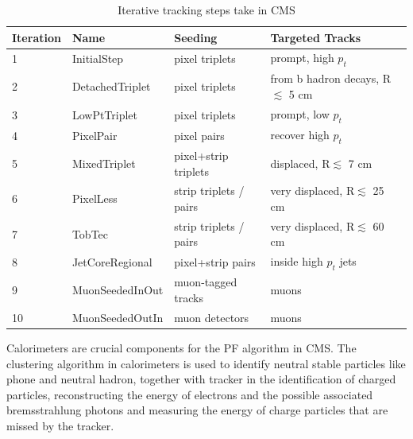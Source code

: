 \begin{table}[!tpb]
\caption{Iterative tracking steps take in CMS \label{tbl:iterative_tracking}}
\label{tab:antil}
\begin{center}
\begin{tabular}{|llll|}   
\hline
Iteration                   &  Name               &   Seeding            &  Targeted Tracks  \\\hline
1                              & InitialStep          & pixel triplets        &  prompt, high $p_{t}$   \\
2                              & DetachedTriplet          & pixel triplets        &  from b hadron decays, R$\lesssim$ 5 cm  \\
3                              & LowPtTriplet          & pixel triplets        &  prompt, low $p_{t}$ \\
4                              & PixelPair          & pixel pairs                &  recover high $p_{t}$ \\
5                              & MixedTriplet          & pixel+strip triplets                &  displaced,  R$\lesssim$ 7 cm   \\
6                              & PixelLess          & strip triplets / pairs               &  very displaced, R$\lesssim$ 25 cm     \\
7                              & TobTec          & strip triplets / pairs               &  very displaced, R$\lesssim$ 60 cm     \\
8                              & JetCoreRegional          & pixel+strip pairs               &  inside high $p_{t}$ jets    \\
9                              & MuonSeededInOut          & muon-tagged tracks               &  muons   \\
10                            & MuonSeededOutIn          & muon detectors                &  muons   \\\hline
\end{tabular}
\end{center}
\end{table}


Calorimeters are crucial components for the PF algorithm in CMS. The clustering algorithm in calorimeters is used to identify neutral stable particles like phone and neutral hadron, together with tracker in the identification of charged particles, reconstructing the energy of electrons and the possible associated bremsstrahlung photons and measuring the energy of charge particles that are missed by the tracker.  

